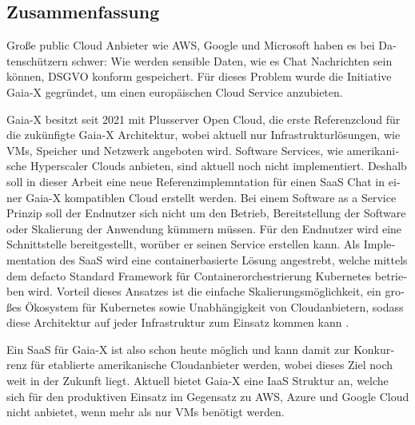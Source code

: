 \begin{otherlanguage}{ngerman}
	\chapter*{Zusammenfassung}

	Große public Cloud Anbieter wie AWS, Google und Microsoft haben es bei Datenschützern schwer:
	Wie werden sensible Daten, wie es Chat Nachrichten sein können, DSGVO konform gespeichert.
	Für dieses Problem wurde die Initiative Gaia-X gegründet, um einen europäischen Cloud Service anzubieten.


	Gaia-X besitzt seit 2021 mit Plusserver Open Cloud, die erste Referenzcloud für die zukünfigte Gaia-X Architektur,
	wobei aktuell nur Infrastrukturlösungen, wie \acp{VM}, Speicher und Netzwerk angeboten wird. 
	Software Services, wie amerikanische Hyperscaler Clouds anbieten, sind aktuell noch nicht implementiert.
	Deshalb soll in dieser Arbeit eine neue Referenzimplemntation für einen \ac{SaaS} Chat in einer Gaia-X kompatiblen Cloud erstellt werden.
	Bei einem Software as a Service Prinzip soll der Endnutzer sich nicht um den Betrieb, Bereitstellung der Software
	oder Skalierung der Anwendung kümmern müssen. Für den Endnutzer wird eine Schnittstelle bereitgestellt, 
	worüber er seinen Service erstellen kann.
	Als Implementation des \ac{SaaS} wird eine containerbasierte Lösung angestrebt, welche mittels dem defacto Standard Framework für 
	Containerorchestrierung Kubernetes \cite{Burns2019} betrieben wird. Vorteil dieses Ansatzes ist die einfache Skalierungsmöglichkeit,
	ein großes Ökosystem für Kubernetes sowie Unabhängigkeit von Cloudanbietern, 
	sodass diese Architektur auf jeder Infrastruktur zum Einsatz kommen kann \cite{Burns2019}.

	Ein \ac{SaaS} für Gaia-X ist also schon heute möglich und kann damit zur Konkurrenz für etablierte amerikanische Cloudanbieter werden,
	wobei dieses Ziel noch weit in der Zukunft liegt. Aktuell bietet Gaia-X eine \ac{IaaS} Struktur an,
	welche sich für den produktiven Einsatz im Gegensatz zu AWS, Azure und Google Cloud nicht anbietet,
	wenn mehr als nur \acp{VM} benötigt werden.
\end{otherlanguage}
